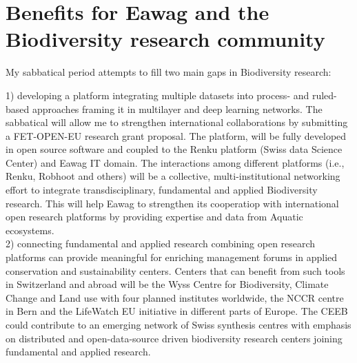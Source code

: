 \documentclass[authoryear,1p,12pt]{elsarticle}
\begin{document}
     \newpage
\section{{\bf Benefits for Eawag and the Biodiversity research community}}
My sabbatical period attempts to fill two main gaps in Biodiversity
research:

1) developing a platform integrating multiple datasets into process-
and ruled-based approaches framing it in multilayer and deep learning
networks. The sabbatical will allow me to strengthen international
collaborations by submitting a FET-OPEN-EU research grant
proposal. The platform, will be fully developed in open source
software and coupled to the Renku platform (Swiss data Science Center)
and Eawag IT domain. The interactions among different platforms (i.e.,
Renku, Robhoot and others) will be a collective, multi-institutional
networking effort to integrate transdisciplinary, fundamental and
applied Biodiversity research. This will help Eawag to strengthen its
cooperatiop with international open research platforms by providing
expertise and data from Aquatic ecosystems.
\\
2) connecting fundamental and applied research combining open research
platforms can provide meaningful for enriching management forums in
applied conservation and sustainability centers. Centers that can
benefit from such tools in Switzerland and abroad will be the Wyss
Centre for Biodiversity, Climate Change and Land use with four planned
institutes worldwide, the NCCR centre in Bern and the LifeWatch EU
initiative in different parts of Europe. The CEEB could contribute to
an emerging network of Swiss synthesis centres with emphasis on
distributed and open-data-source driven biodiversity research centers
joining fundamental and applied research.




%
%
\end{document}
